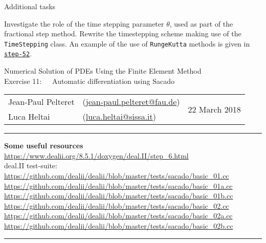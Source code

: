 \documentclass[11pt,answers]{exam}
\makeatletter
\newcommand{\makeheader}[3]{%
\setcounter{question}{0}
\begin{center}
{\sc Numerical Solution of PDEs Using the Finite Element Method}\vspace{2ex}\\
{\sc Exercise #1:\ \ \ #2}\vspace{2ex}\\
\begin{tabular*}{\textwidth}{ll @{\extracolsep{\fill}}r}
Jean-Paul Pelteret & (\url{jean-paul.pelteret@fau.de}) & \multirow{2}{*}{#3} \\
Luca Heltai & (\url{luca.heltai@sissa.it}) & \\
\end{tabular*}
\end{center}
}
\newcommand{\makeresources}[1]{%
\rule{\textwidth}{0.6mm}
\textbf{Some useful resources}\\[1.5ex]
#1 \par
\rule{\textwidth}{0.6mm}
}
\makeatother
\begin{document}
\begin{questions}

\question Additional tasks
\begin{parts}
\bonuspart Investigate the role of the time stepping parameter $\theta$, used as part of the fractional step method.
\bonuspart Rewrite the timestepping scheme making use of the \verb|TimeStepping| class. An example of the use of \verb|RungeKutta| methods is given in \href{https://www.dealii.org/developer/doxygen/deal.II/step_52.html}{\texttt{step-52}}.
\end{parts}

\end{questions}




\clearpage
\makeheader{11}{Automatic differentiation using Sacado}{22 March 2018}
\makeresources{%
\url{https://www.dealii.org/8.5.1/doxygen/deal.II/step_6.html}\\
deal.II test-suite: \\
\url{https://github.com/dealii/dealii/blob/master/tests/sacado/basic_01.cc}\\
\url{https://github.com/dealii/dealii/blob/master/tests/sacado/basic_01a.cc}\\
\url{https://github.com/dealii/dealii/blob/master/tests/sacado/basic_01b.cc}\\
\url{https://github.com/dealii/dealii/blob/master/tests/sacado/basic_02.cc}\\
\url{https://github.com/dealii/dealii/blob/master/tests/sacado/basic_02a.cc}\\
\url{https://github.com/dealii/dealii/blob/master/tests/sacado/basic_02b.cc}
}
\end{document}
